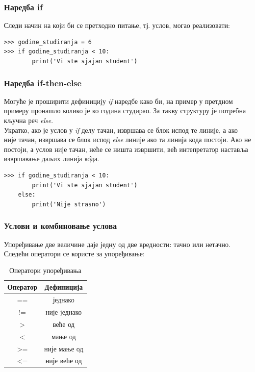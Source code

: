 		\subsubsection{Наредба if}
		Следи начин на који би се претходно питање, тј. услов, могао реализовати:
		\begin{lstlisting}[caption = Пример услова, label = if]
>>> godine_studiranja = 6
>>> if godine_studiranja < 10:
        print('Vi ste sjajan student') 
		\end{lstlisting}
		\subsubsection{Наредба if-then-else}
		
		Могуће је проширити дефиницију \emph{if} наредбе како би, на пример у претдном примеру пронашло колико је ко година студирао. За такву структуру је потребна кључна реч \emph{else}. \\
		Укратко, ако је услов у \emph{if} делу тачан, извршава се блок испод те линије, а ако није тачан, извршава се блок испод \emph{else} линије ако та линија кода постоји. Ако не постоји, а услов није тачан, неће се ништа извршити, већ интепретатор наставља извршавање даљих линија к\^{о}да. 
		\begin{lstlisting}[caption = Пример за наредбе IF - ELSE, label = ifelse]
>>> if godine_studiranja < 10:
        print('Vi ste sjajan student')
    else:
        print('Nije strasno')
        \end{lstlisting}
        \subsubsection{Услови и комбиновање услова}
        Упоређивање две величине даје једну од две вредности: тачно или нетачно. Следећи оператори се користе за упоређивање:
        \begin{table}[here]
        \centering    
        \begin{tabular}{|c|c|} \hline
        \textbf{Оператор} & \textbf{Дефиниција} \\ \hline \hline
        == & једнако \\ \hline
        != & није једнако \\ \hline
        > & веће од  \\ \hline
        < & мање од \\ \hline
        >= & није мање од \\ \hline
        <= & није веће од \\ \hline
        \end{tabular}\medskip
        \caption{Оператори упоређивања}
        \label{tabele:opporedjenja}
        \end{table}\\
        
